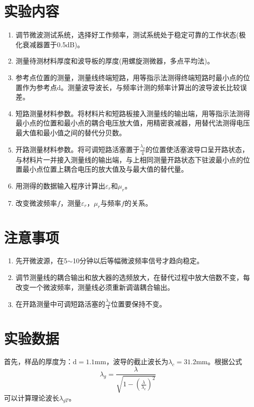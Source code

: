 \documentclass[a4paper]{article}
\begin{document}
\section{实验内容}
\begin{enumerate}
	\item 调节微波测试系统，选择好工作频率，测试系统处于稳定可靠的工作状态(极化衰减器置于0.5dB)。
	\item 测量待测材料厚度和波导板的厚度(用螺旋测微器，多点平均法)。
	\item 参考点位置的测量，测量线终端短路，用等指示法测得终端短路时最小点的位置作为参考点d。测量波导波长，与频率计测的频率计算出的波导波长比较误差。
	\item 短路测量材料参数。将材料片和短路板接入测量线的输出端，用等指示法测得最小点的位置和最小点的耦合电压放大值，用精密衰减器，用替代法测得电压最大值和最小值之间的替代分贝数。
	\item 开路测量材料参数。将可调短路活塞置于$\frac{\lambda_g}{4}$的位置使活塞波导口呈开路状态，与材料片一并接入测量线的输出端，与上相同测量开路状态下驻波最小点的位置最小点位置上耦合电压的放大值及与最大值的替代量。
	\item 用测得的数据输入程序计算出$\varepsilon_r$和$\mu_r$。
	\item 改变微波频率$f$，测量$\varepsilon_r$，$\mu_r$与频率$f$的关系。
\end{enumerate}

\section{注意事项}
\begin{enumerate}
	\item 先开微波源，在5$\sim$10分钟以后等幅微波频率信号才趋向稳定。
	\item 调节测量线的耦合输出和放大器的选频放大，在替代过程中放大倍数不变，每改变一个微波频率，测量线必须重新调谐耦合输出。
	\item 在开路测量中可调短路活塞的$\frac{\lambda_g}{4}$位置要保持不变。
\end{enumerate}

\section{实验数据}
首先，样品的厚度为：$\text{d} = 1.1\text{mm}$，波导的截止波长为$\lambda_c =  31.2\text{mm}$。根据公式
\begin{equation*}
	\lambda_g = \frac{\lambda}{\sqrt{1 - (\frac{\lambda}{\lambda_c})^2}}
\end{equation*}
可以计算理论波长$\lambda_{gT}$。
\end{document}
